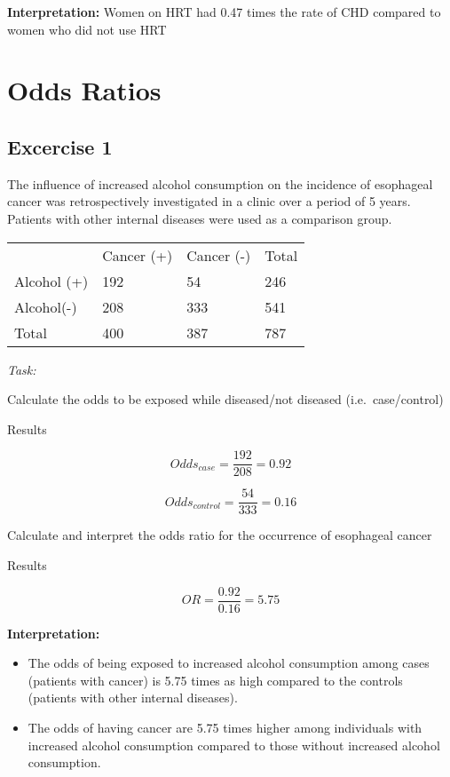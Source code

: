 \documentclass[
  14pt,
  letterpaper,
  DIV=11,
  numbers=noendperiod]{scrreprt}
\begin{document}
\textbf{Interpretation:} Women on HRT had 0.47 times the rate of CHD
compared to women who did not use HRT

\section{Odds Ratios}\label{odds-ratios}

\subsection{Excercise 1}\label{excercise-1-1}

The influence of increased alcohol consumption on the incidence of
esophageal cancer was retrospectively investigated in a clinic over a
period of 5 years. Patients with other internal diseases were used as a
comparison group.

\begin{longtable}[]{@{}llll@{}}
\toprule\noalign{}
\endhead
\bottomrule\noalign{}
\endlastfoot
& Cancer (+) & Cancer (-) & Total \\
Alcohol (+) & 192 & 54 & 246 \\
Alcohol(-) & 208 & 333 & 541 \\
Total & 400 & 387 & 787 \\
\end{longtable}

\emph{Task:}

Calculate the odds to be exposed while diseased/not diseased
(i.e.~case/control)

Results

\[
Odds_{case} = \frac{192}{208} = 0.92
\]

\[
Odds_{control} = \frac{54}{333} = 0.16
\]

Calculate and interpret the odds ratio for the occurrence of esophageal
cancer

Results

\[
OR = \frac{0.92}{0.16} = 5.75
\]

\textbf{Interpretation:}

\begin{itemize}
\item
  The odds of being exposed to increased alcohol consumption among cases
  (patients with cancer) is 5.75 times as high compared to the controls
  (patients with other internal diseases).
\item
  The odds of having cancer are 5.75 times higher among individuals with
  increased alcohol consumption compared to those without increased
  alcohol consumption.
\end{itemize}
\end{document}
